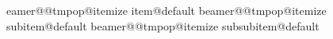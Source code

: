 \makeatletter
\expandafter\let\csname beamer@@tmpop@itemize item@default\endcsname\relax
\expandafter\let\csname beamer@@tmpop@itemize subitem@default\endcsname\relax
\expandafter\let\csname beamer@@tmpop@itemize subsubitem@default\endcsname\relax


\bidi@patchcmd{\@listi}{\leftmargin}{\rightmargin}{}{}
\let\@listI\@listi
\bidi@patchcmd{\@listii}{\leftmargin}{\rightmargin}{}{}
\bidi@patchcmd{\@listiii}{\leftmargin}{\rightmargin}{}{}
\bidi@patchcmd{\beamer@enum@}{\raggedright}{\raggedleft}{}{}
\bidi@patchcmd{\@@description}{\raggedright}{\raggedleft}{}{}
\bidi@patchcmd{\@@description}{\leftmargin}{\rightmargin}{}{}

